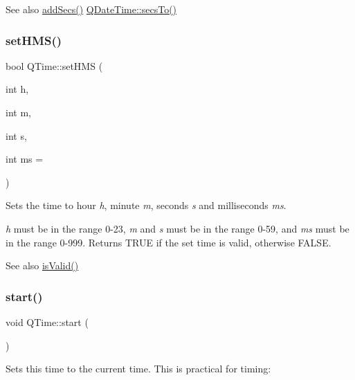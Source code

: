 \begin{DoxySeeAlso}{See also}
\mbox{\hyperlink{class_q_time_ae5ba40307760c49c56896da08d69c363}{add\+Secs()}} \mbox{\hyperlink{class_q_date_time_a3b697a289865bc96bd339acaa75880b3}{Q\+Date\+Time\+::secs\+To()}} 
\end{DoxySeeAlso}
\mbox{\label{class_q_time_a9c52b0963595ba4acd9b5922a5beeb06}} 
\subsubsection{\texorpdfstring{setHMS()}{setHMS()}}
{\footnotesize\ttfamily bool Q\+Time\+::set\+H\+MS (\begin{DoxyParamCaption}\item[{int}]{h,  }\item[{int}]{m,  }\item[{int}]{s,  }\item[{int}]{ms = {} }\end{DoxyParamCaption})}

Sets the time to hour {\itshape h}, minute {\itshape m}, seconds {\itshape s} and milliseconds {\itshape ms}.

{\itshape h} must be in the range 0-\/23, {\itshape m} and {\itshape s} must be in the range 0-\/59, and {\itshape ms} must be in the range 0-\/999. Returns T\+R\+UE if the set time is valid, otherwise F\+A\+L\+SE.

\begin{DoxySeeAlso}{See also}
\mbox{\hyperlink{class_q_time_a4f54e1193a12519a7bd9efb7ea16fdca}{is\+Valid()}} 
\end{DoxySeeAlso}
\mbox{\label{class_q_time_aafacb3c8da8d383b7e688f6df20c8835}} 
\subsubsection{\texorpdfstring{start()}{start()}}
{\footnotesize\ttfamily void Q\+Time\+::start (\begin{DoxyParamCaption}{ }\end{DoxyParamCaption})}

Sets this time to the current time. This is practical for timing\+:


\begin{DoxyCode}{0}
\end{DoxyCode}


